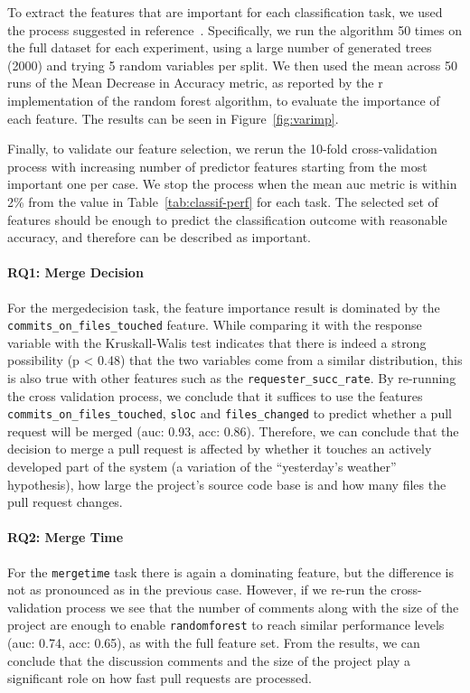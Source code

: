 \documentclass{sig-alternate}
\begin{document}
To extract the features that are important for each classification task, we
used the process suggested in reference~\cite{Genue10}. Specifically, we run
the algorithm 50 times on the full dataset for each experiment, using a large
number of generated trees (2000) and trying 5 random variables per split. We
then used the mean across 50 runs of the  Mean Decrease in Accuracy metric, as
reported by the {\sc r} implementation of the random forest algorithm, to
evaluate the importance of each feature. The results can be seen in
Figure~\ref{fig:varimp}.

Finally, to validate our feature selection, we rerun the 10-fold
cross-validation process with increasing number of predictor features starting
from the most important one per case. We stop the process when the mean {\sc
auc} metric is within 2\% from the value in Table~\ref{tab:classif-perf} for
each task. The selected set of features should be enough to predict the
classification outcome with reasonable accuracy, and therefore can be described
as important.

\paragraph{RQ1: Merge Decision}

For the \textsf{mergedecision} task, the feature importance result is dominated
by the \texttt{commits\_on\_files\_touched} feature. While comparing it with the
response variable with the Kruskall-Walis test indicates that there is indeed a
strong possibility (p < 0.48) that the two variables come from a similar
distribution, this is also true with other features such as the
\texttt{requester\_succ\_rate}. By re-running the cross validation process, we conclude
that it suffices to use the features \texttt{commits\_on\_files\_touched},
\texttt{sloc} and \texttt{files\_changed} to predict whether a pull request will
be merged ({\sc auc:} 0.93, {\sc acc}: 0.86). Therefore, we can conclude that the decision to merge a pull request
is affected by whether it touches an actively developed part of the system (a
variation of the ``yesterday's weather'' hypothesis), how large the project's
source code base is and how many files the pull request changes.

\paragraph{RQ2: Merge Time}

For the \texttt{mergetime} task there is again a dominating feature, but the
difference is not as pronounced as in the previous case. However, if we re-run
the cross-validation process we see that the number of comments along with the
size of the project are enough to enable \texttt{randomforest} to reach similar
performance levels ({\sc auc:} 0.74, {\sc acc}: 0.65), as with the full feature
set. From the results, we can conclude that the discussion comments and the size
of the project play a significant role on how fast pull requests are processed. 
\end{document}
